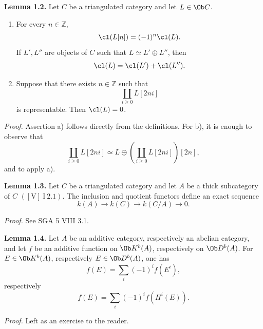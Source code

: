 \textbf{Lemma 1.2.} Let \(C\) be a triangulated category and let \(L\in\Ob C\).
\begin{enumerate}[label=\alph*)]
\item For every \(n\in\mathbb Z\),
\[
 \cl(L[n])=(-1)^n\cl(L).
\]
If \(L',L''\) are objects of \(C\) such that \(L\simeq L'\oplus L''\), then
\[
 \cl(L)=\cl(L')+\cl(L'').
\]
\item Suppose that there exists \(n\in\mathbb Z\) such that
\[
 \coprod_{i\geq0} L[2ni]
\]
is representable. Then \(\cl(L)=0\).
\end{enumerate}

\emph{Proof.} Assertion a) follows directly from the definitions. For b), it is enough to observe that
\[
 \coprod_{i\geq0} L[2ni]\simeq
 L\oplus\left(\coprod_{i\geq0}L[2ni]\right)[2n],
\]
and to apply a).

\textbf{Lemma 1.3.} Let \(C\) be a triangulated category and let \(A\) be a thick subcategory of \(C\) \(([\mathrm V]\ \mathrm{I}\ 2.1)\). The inclusion and quotient functors define an exact sequence
\[
 k(A)\longrightarrow k(C)\longrightarrow k(C/A)\longrightarrow 0.
\]

\emph{Proof.} See SGA 5 VIII 3.1.

\textbf{Lemma 1.4.} Let \(A\) be an additive category, respectively an abelian category, and let \(f\) be an additive function on \(\Ob K^b(A)\), respectively on \(\Ob D^b(A)\). For \(E\in\Ob K^b(A)\), respectively \(E\in\Ob D^b(A)\), one has
\[
 f(E)=\sum_i(-1)^i f(E^i),
\]
respectively
\[
 f(E)=\sum_i(-1)^i f(H^i(E)).
\]

\emph{Proof.} Left as an exercise to the reader.


